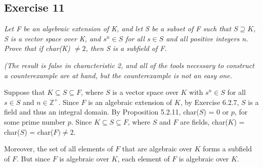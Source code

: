 \subsection*{Exercise 11}
\textit{Let F be an algebraic extension of K, and let S be a subset of F such that $S \supseteq K$, S is a vector space over K, and $s^n \in S$ for all $s \in S$ and all positive integers n. Prove that if char(K) $\not= 2$, then S is a subfield of F.}

\textit{(The result is false in characteristic 2, and all of the tools necessary to construct a counterexample are at hand, but the counterexample is not an easy one.}

\vspace{5 mm}
Suppose that $K \subseteq S \subseteq F$, where $S$ is a vector space over $K$ with $s^n \in S$ for all $s \in S$ and $n \in \mathbb{Z}^+$. Since $F$ is an algebraic extension of $K$, by Exercise 6.2.7, $S$ is a field and thus an integral domain. By Proposition 5.2.11, char($S$) = 0 or $p$, for some prime number $p$. Since $K \subseteq S \subseteq F$, where $S$ and $F$ are fields, char($K$) = char($S$) = char($F) \not= 2$.

Moreover, the set of all elements of $F$ that are algebraic over $K$ forms a subfield of $F$. But since $F$ is algebraic over $K$, each element of $F$ is algebraic over $K$.